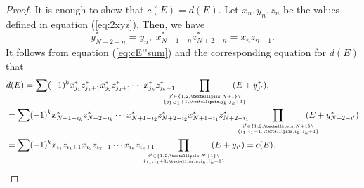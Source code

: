 \documentclass[10pt,a4paper]{amsart}
\begin{document}
\begin{proof}
It is enough to show that $c(E) = d(E)$.
Let $x_n , y_n, z_n$ be the values defined in equation (\ref{eq:2xyz}).
Then, we have
\begin{equation*}
y^* _{N+2-n} =y_n , \; x^* _{N+1-n} z^* _{N+2-n} = x_n z_{n+1} .
\end{equation*}
It follows from equation (\ref{eq:cE''sum}) and the corresponding equation for $d(E)$ that
\begin{align*}
 & d (E) = \sum (-1) ^k x^* _{j_1} z^* _{j_1 +1 } x^* _{j_2} z^* _{j_2 +1 } \cdots x^* _{j_k} z^* _{j_k +1 } \! \! \! \! \! \! \! \! \! \!  \prod _{j' \in \{ 1,2, \dots ,N +1 \} \setminus \atop{\{ j_1 , j_1 +1 , \dots , j_k , j_k +1  \} }} \! \! \! \! \! \! \! \! \! \! (E + y^* _{j'} ) , \\
& = \sum (-1) ^k x^* _{N+1 - i_k} z^* _{N +2 - i_k } \cdots x^* _{N+1 -i_2} z^* _{N+2 - i_2 } x^* _{N+1 -i_1} z^* _{N+2 -i_1 } \! \! \! \! \! \! \! \! \! \! \prod _{i' \in \{ 1,2, \dots ,N +1 \} \setminus \atop{\{ i_1 , i_1 +1 , \dots , i_k , i_k +1  \} }}  \! \! \! \! \! \! \! \! \! \!  (E + y^* _{N+2-i'} ) \notag \\
 &  = \sum (-1) ^k x _{i_1} z _{i_1 +1 } x _{i_2} z _{i_2 +1 } \cdots x _{i_k} z _{i_k +1 } \! \! \! \! \! \! \! \! \! \!  \prod _{i' \in \{ 1,2, \dots ,N +1 \} \setminus \atop{\{ i_1 , i_1 +1 , \dots , i_k , i_k +1  \} }} \! \! \! \! \! \! \! \! \! \! (E + y _{i'} ) = c(E) . \notag 
\end{align*}
\end{proof}
\end{document}
